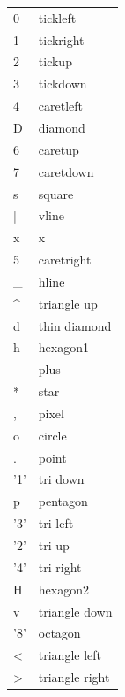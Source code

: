 \documentclass{article}
\begin{document}
\begin{multicols}{2}
    \begin{tabular}{ l l }
        0 & tickleft\\
        1 & tickright\\
        2 & tickup\\
        3 & tickdown\\
        4 & caretleft\\
        D & diamond\\
        6 & caretup\\
        7 & caretdown\\
        s & square\\
        | & vline\\
        x & x\\
        5 & caretright\\
        \_ & hline\\
        \^{} & triangle up\\
        d & thin diamond\\
        h & hexagon1\\
        + & plus\\
        * & star\\
        , & pixel\\
        o & circle\\
        . & point\\
        '1' & tri down\\
        p & pentagon\\
        '3' & tri left\\
        '2' & tri up\\
        '4' & tri right\\
        H & hexagon2\\
        v & triangle down\\
        '8' & octagon\\
        \textless & triangle left\\
        \textgreater & triangle right
    \end{tabular}

\end{multicols}



\end{document}
